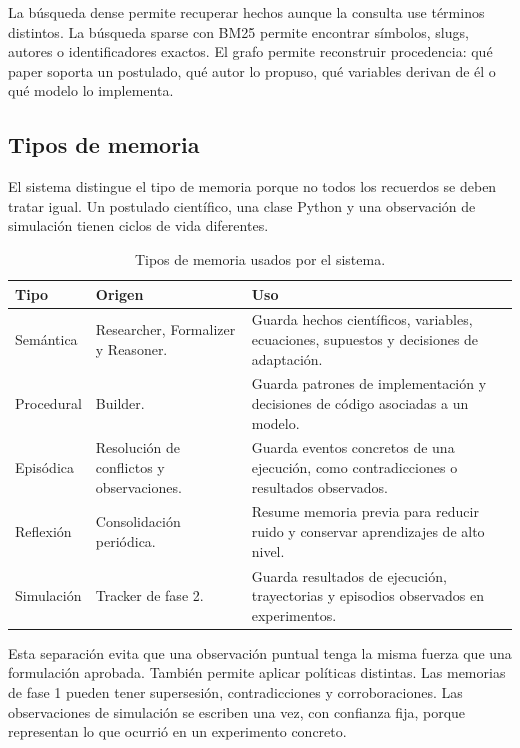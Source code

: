 La búsqueda dense permite recuperar hechos aunque la consulta use términos
distintos. La búsqueda sparse con BM25 permite encontrar símbolos, slugs,
autores o identificadores exactos. El grafo permite reconstruir procedencia:
qué paper soporta un postulado, qué autor lo propuso, qué variables derivan de
él o qué modelo lo implementa.

\subsection{Tipos de memoria}

El sistema distingue el tipo de memoria porque no todos los recuerdos se deben
tratar igual. Un postulado científico, una clase Python y una observación de
simulación tienen ciclos de vida diferentes.

\begin{table}[H]
\begin{center}
\small
\begin{tabular}{|p{2.8cm}|p{3.5cm}|p{5.9cm}|} \hline
\textbf{Tipo} & \textbf{Origen} & \textbf{Uso} \\ \hline
Semántica & Researcher, Formalizer y Reasoner. & Guarda hechos científicos, variables, ecuaciones, supuestos y decisiones de adaptación. \\ \hline
Procedural & Builder. & Guarda patrones de implementación y decisiones de código asociadas a un modelo. \\ \hline
Episódica & Resolución de conflictos y observaciones. & Guarda eventos concretos de una ejecución, como contradicciones o resultados observados. \\ \hline
Reflexión & Consolidación periódica. & Resume memoria previa para reducir ruido y conservar aprendizajes de alto nivel. \\ \hline
Simulación & Tracker de fase 2. & Guarda resultados de ejecución, trayectorias y episodios observados en experimentos. \\ \hline
\end{tabular}
\caption{Tipos de memoria usados por el sistema.}
\end{center}
\end{table}

Esta separación evita que una observación puntual tenga la misma fuerza que una
formulación aprobada. También permite aplicar políticas distintas. Las memorias
de fase 1 pueden tener supersesión, contradicciones y corroboraciones. Las
observaciones de simulación se escriben una vez, con confianza fija, porque
representan lo que ocurrió en un experimento concreto.

